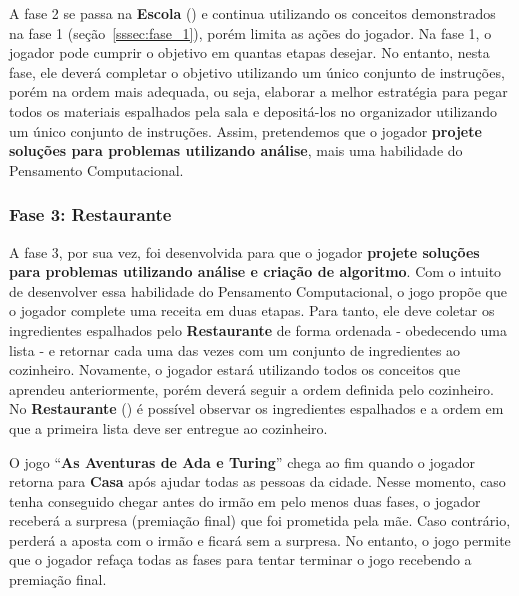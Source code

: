 A fase 2 se passa na \textbf{Escola} () e continua utilizando os conceitos demonstrados na fase 1 (seção~\ref{sssec:fase_1}), porém limita as ações do jogador. Na fase 1, o jogador pode cumprir o objetivo em quantas etapas desejar. No entanto, nesta fase, ele deverá completar o objetivo utilizando um único conjunto de instruções, porém na ordem mais adequada, ou seja, elaborar a melhor estratégia para pegar todos os materiais espalhados pela sala e depositá-los no organizador utilizando um único conjunto de instruções. Assim, pretendemos que o jogador \textbf{projete soluções para problemas utilizando análise}, mais uma habilidade do Pensamento Computacional.


\subsubsection{Fase 3: Restaurante} \label{sssec:fase_3}

A fase 3, por sua vez, foi desenvolvida para que o jogador \textbf{projete soluções para problemas utilizando análise e criação de algoritmo}. Com o intuito de desenvolver essa habilidade do Pensamento Computacional, o jogo propõe que o jogador complete uma receita em duas etapas. Para tanto, ele deve coletar os ingredientes espalhados pelo \textbf{Restaurante} de forma ordenada - obedecendo uma lista - e retornar cada uma das vezes com um conjunto de ingredientes ao cozinheiro. Novamente, o jogador estará utilizando todos os conceitos que aprendeu anteriormente, porém deverá seguir a ordem definida pelo cozinheiro. No \textbf{Restaurante} () é possível observar os ingredientes espalhados e a ordem em que a primeira lista deve ser entregue ao cozinheiro.


O jogo “\textbf{As Aventuras de Ada e Turing}” chega ao fim quando o jogador retorna para \textbf{Casa} após ajudar todas as pessoas da cidade. Nesse momento, caso tenha conseguido chegar antes do irmão em pelo menos duas fases, o jogador receberá a surpresa (premiação final) que foi prometida pela mãe. Caso contrário, perderá a aposta com o irmão e ficará sem a surpresa. No entanto, o jogo permite que o jogador refaça todas as fases para tentar terminar o jogo recebendo a premiação final. 